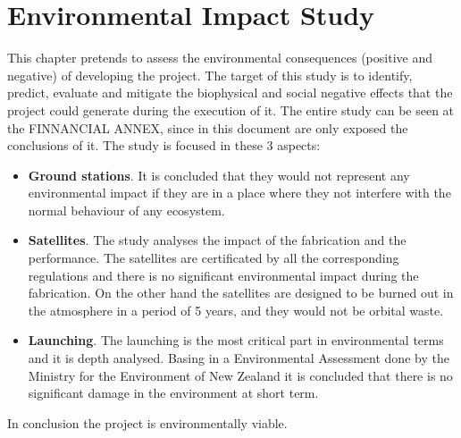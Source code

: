 \chapter{Environmental Impact Study}
This chapter pretends to assess the environmental consequences (positive and negative) of developing the project. The target of this study is to identify, predict, evaluate and mitigate the biophysical and social negative effects that the project could generate during the execution of it. The entire study can be seen at the FINNANCIAL ANNEX, since in this document are only exposed the conclusions of it.
The study is focused in these 3 aspects:
\begin{itemize}
\item \textbf{Ground stations}. It is concluded that they would not represent any environmental impact if they are in a place where they not interfere with the normal behaviour of any ecosystem.
\item \textbf{Satellites}. The study analyses the impact of the fabrication and the performance. The satellites are certificated by all the corresponding regulations and there is no significant environmental impact during the fabrication. On the other hand the satellites are designed to be burned out in the atmosphere in a period of 5 years, and they would not be orbital waste.
\item \textbf{Launching}. The launching is the most critical part in environmental terms and it is depth analysed. Basing in a Environmental Assessment done by the Ministry for the Environment of New Zealand \cite{EIS} it is concluded that there is no significant damage in the environment at short term.
\end{itemize}
In conclusion the project is environmentally viable.